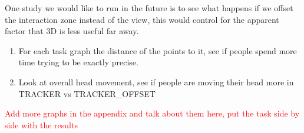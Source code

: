 One study we would like to run in the future is to see what happens if we offset the interaction zone instead of the view, this would control for the apparent factor that 3D is less useful far away.  

\begin{enumerate}
	\item For each task graph the distance of the points to it, see if people spend more time trying to be exactly precise.
	\item Look at overall head movement, see if people are moving their head more in TRACKER vs TRACKER\_OFFSET
\end{enumerate}

\textcolor{red}{Add more graphs in the appendix and talk about them here, put the task side by side with the results}